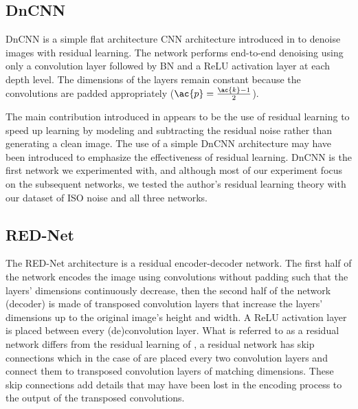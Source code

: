 \subsection{DnCNN}
DnCNN is a simple flat architecture \ac{CNN} architecture introduced in \cite{dncnn} to denoise images with residual learning. The network performs end-to-end denoising using only a convolution layer followed by \ac{BN} and a \ac{ReLU} activation layer at each depth level. The dimensions of the layers remain constant because the convolutions are padded appropriately ($\ac{p}={\ac{k}-1\over{2}}$). %

The main contribution introduced in \cite{dncnn} appears to be the use of residual learning to speed up learning by modeling and subtracting the residual noise rather than generating a clean image. The use of a simple DnCNN architecture may have been introduced to emphasize the effectiveness of residual learning. DnCNN is the first network we experimented with, and although most of our experiment focus on the subsequent networks, we tested the author's residual learning theory with our dataset of ISO noise and all three networks.
\subsection{RED-Net}
The \ac{RED-Net} architecture is a residual encoder-decoder network. The first half of the network encodes the image using convolutions without padding such that the layers' dimensions continuously decrease, then the second half of the network (decoder) is made of transposed convolution layers that increase the layers' dimensions up to the original image's height and width. A \ac{ReLU} activation layer is placed between every (de)convolution layer. What is referred to as a residual network differs from the residual learning of \cite{dncnn}, a residual network has skip connections which in the case of \cite{rednet} are placed every two convolution layers and connect them to transposed convolution layers of matching dimensions. These skip connections add details that may have been lost in the encoding process to the output of the transposed convolutions. 

